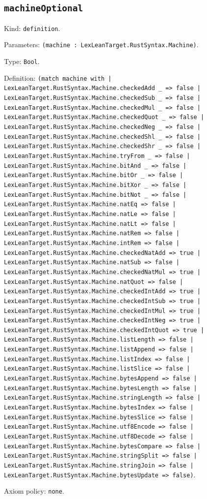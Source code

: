 \documentclass[11pt]{article}
\begin{document}
\subsection*{\texttt{machineOptional}}
\noindent Kind: \texttt{definition}.\par
\noindent Parameters: \texttt{(machine : LexLeanTarget.RustSyntax.Machine)}.\par
\noindent Type: \texttt{Bool}.\par
\noindent Definition: \texttt{(match machine with | LexLeanTarget.RustSyntax.Machine.checkedAdd \_ => false | LexLeanTarget.RustSyntax.Machine.checkedSub \_ => false | LexLeanTarget.RustSyntax.Machine.checkedMul \_ => false | LexLeanTarget.RustSyntax.Machine.checkedQuot \_ => false | LexLeanTarget.RustSyntax.Machine.checkedNeg \_ => false | LexLeanTarget.RustSyntax.Machine.checkedShl \_ => false | LexLeanTarget.RustSyntax.Machine.checkedShr \_ => false | LexLeanTarget.RustSyntax.Machine.tryFrom \_ => false | LexLeanTarget.RustSyntax.Machine.bitAnd \_ => false | LexLeanTarget.RustSyntax.Machine.bitOr \_ => false | LexLeanTarget.RustSyntax.Machine.bitXor \_ => false | LexLeanTarget.RustSyntax.Machine.bitNot \_ => false | LexLeanTarget.RustSyntax.Machine.natEq => false | LexLeanTarget.RustSyntax.Machine.natLe => false | LexLeanTarget.RustSyntax.Machine.natLt => false | LexLeanTarget.RustSyntax.Machine.natRem => false | LexLeanTarget.RustSyntax.Machine.intRem => false | LexLeanTarget.RustSyntax.Machine.checkedNatAdd => true | LexLeanTarget.RustSyntax.Machine.natSub => false | LexLeanTarget.RustSyntax.Machine.checkedNatMul => true | LexLeanTarget.RustSyntax.Machine.natQuot => false | LexLeanTarget.RustSyntax.Machine.checkedIntAdd => true | LexLeanTarget.RustSyntax.Machine.checkedIntSub => true | LexLeanTarget.RustSyntax.Machine.checkedIntMul => true | LexLeanTarget.RustSyntax.Machine.checkedIntNeg => true | LexLeanTarget.RustSyntax.Machine.checkedIntQuot => true | LexLeanTarget.RustSyntax.Machine.listLength => false | LexLeanTarget.RustSyntax.Machine.listAppend => false | LexLeanTarget.RustSyntax.Machine.listIndex => false | LexLeanTarget.RustSyntax.Machine.listSlice => false | LexLeanTarget.RustSyntax.Machine.bytesAppend => false | LexLeanTarget.RustSyntax.Machine.bytesLength => false | LexLeanTarget.RustSyntax.Machine.stringLength => false | LexLeanTarget.RustSyntax.Machine.bytesIndex => false | LexLeanTarget.RustSyntax.Machine.bytesSlice => false | LexLeanTarget.RustSyntax.Machine.utf8Encode => false | LexLeanTarget.RustSyntax.Machine.utf8Decode => false | LexLeanTarget.RustSyntax.Machine.bytesCompare => false | LexLeanTarget.RustSyntax.Machine.stringSplit => false | LexLeanTarget.RustSyntax.Machine.stringJoin => false | LexLeanTarget.RustSyntax.Machine.bytesUpdate => false)}.\par
\noindent Axiom policy: \texttt{none}.\par
\end{document}

